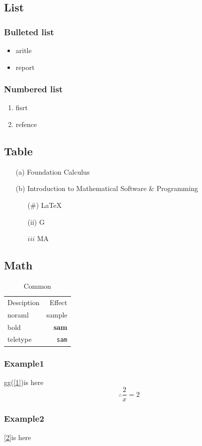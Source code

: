 \documentclass{article}
\begin{document}
\subsection{List}
\subsubsection{Bulleted list}
\begin{itemize}
\item aritle
\item report
\end{itemize}
\subsubsection{Numbered list}
\begin{enumerate}
\item fisrt
\item refence
\end{enumerate}
\subsection{Table}
\begin{itemize}
\item[(a)]  Foundation Calculus
\item[(b)] Introduction to Mathematical Software \& Programming
	\begin{itemize}
	\item[(\#)]\LaTeX
	\item[(ii)]G
	\item[$iii$]MA
	\end{itemize}
\end{itemize}
\subsection{Math}
\begin{table}[h]
\centering
\begin{tabular}{|l|r|}
\hline
Desciption&Effect\\
noraml&sample\\
bold&\textbf{sam}\\
teletype&\texttt{sam}\\
\hline
\end{tabular}
\caption{Common}
\end{table}
\subsubsection{Example1}
 gg(\ref{1})is here
\begin{equation}
\therefore \frac{2}{x}=2\label{2}
\end{equation}
\subsubsection{Example2}
\ref{2}is here
\end{document}
